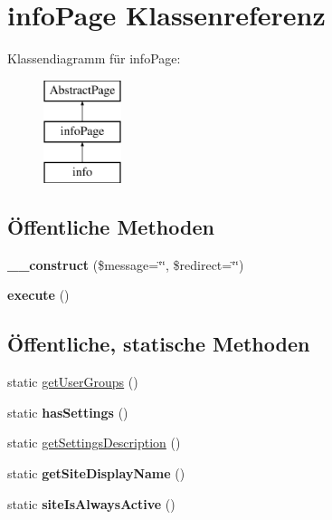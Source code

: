 \hypertarget{classinfo_page}{}\section{info\+Page Klassenreferenz}
\label{classinfo_page}
Klassendiagramm für info\+Page\+:\begin{figure}[H]
\begin{center}
\leavevmode
\includegraphics[height=3.000000cm]{classinfo_page}
\end{center}
\end{figure}
\subsection*{Öffentliche Methoden}
\begin{DoxyCompactItemize}
\item 
\mbox{\label{classinfo_page_a0e58ecd594633e8a0fb892bebe1b8ad2}} 
{\bfseries \+\_\+\+\_\+construct} (\$message=\char`\"{}\char`\"{}, \$redirect=\char`\"{}\char`\"{})
\item 
\mbox{\label{classinfo_page_ae4cf02693761b653ac87d26228fec555}} 
{\bfseries execute} ()
\end{DoxyCompactItemize}
\subsection*{Öffentliche, statische Methoden}
\begin{DoxyCompactItemize}
\item 
static \mbox{\hyperlink{classinfo_page_a059f62e9b4eec098b2508a94ae48c1ec}{get\+User\+Groups}} ()
\item 
\mbox{\label{classinfo_page_a2c158daeed08c6792fc5c1fa6b6e1aa9}} 
static {\bfseries has\+Settings} ()
\item 
static \mbox{\hyperlink{classinfo_page_a4697f95b436d1a2b7221a3534f3a5fce}{get\+Settings\+Description}} ()
\item 
\mbox{\label{classinfo_page_aaaf2d8b1bfef4d9917cbbe180b4c26cf}} 
static {\bfseries get\+Site\+Display\+Name} ()
\item 
\mbox{\label{classinfo_page_ad046046dcd26fe50bb4f6a1eed76fae6}} 
static {\bfseries site\+Is\+Always\+Active} ()
\end{DoxyCompactItemize}
